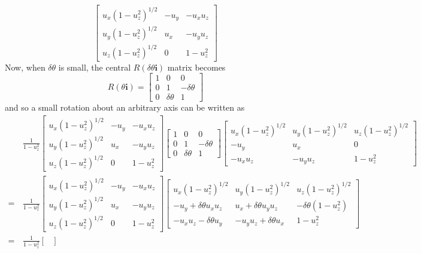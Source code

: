 \documentclass[../principles-of-quantum-mechanics.tex]{subfiles}
\begin{document}
\begin{questions}
\begin{solution}
$$\begin{bmatrix}
			u_x(1 - u_z^2)^{1/2} & -u_y & -u_xu_z \\
			u_y(1 - u_z^2)^{1/2} & u_x & -u_yu_z \\
			u_z(1 - u_z^2)^{1/2} & 0 & 1 - u_z^2
		\end{bmatrix}$$
		Now, when $\delta\theta$ is small, the central $R(\delta\theta\mathbf{i})$ matrix becomes
		$$R(\theta\mathbf{i}) = \begin{bmatrix}
			1 & 0 & 0 \\
			0 & 1 & -\delta\theta \\
			0 & \delta\theta & 1
		\end{bmatrix}$$
		and so a small rotation about an arbitrary axis can be written as
		\begin{align*}
			&\frac{1}{1 - u_z^2}\begin{bmatrix}
				u_x(1 - u_z^2)^{1/2} & -u_y & -u_xu_z \\
				u_y(1 - u_z^2)^{1/2} & u_x & -u_yu_z \\
				u_z(1 - u_z^2)^{1/2} & 0 & 1 - u_z^2
			\end{bmatrix}\begin{bmatrix}
				1 & 0 & 0 \\
				0 & 1 & -\delta\theta \\
				0 & \delta\theta & 1
			\end{bmatrix}\begin{bmatrix}
			u_x(1 - u_z^2)^{1/2} & u_y(1 - u_z^2)^{1/2} & u_z(1 - u_z^2)^{1/2} \\
			-u_y & u_x & 0 \\
			-u_xu_z & -u_yu_z & 1 - u_z^2
		\end{bmatrix} \\
		=\,&\frac{1}{1 - u_z^2}\begin{bmatrix}
			u_x(1 - u_z^2)^{1/2} & -u_y & -u_xu_z \\
			u_y(1 - u_z^2)^{1/2} & u_x & -u_yu_z \\
			u_z(1 - u_z^2)^{1/2} & 0 & 1 - u_z^2
		\end{bmatrix}\begin{bmatrix}
			u_x(1 - u_z^2)^{1/2} & u_y(1 - u_z^2)^{1/2} & u_z(1 - u_z^2)^{1/2} \\
			-u_y + \delta\theta u_xu_z & u_x + \delta\theta u_y u_z & -\delta\theta(1 - u_z^2) \\
			-u_xu_z - \delta\theta u_y & -u_yu_z + \delta\theta u_x & 1 - u_z^2
		\end{bmatrix} \\
		=\,&\frac{1}{1 - u_z^2}\begin{bmatrix}

\end{bmatrix}
\end{align*}
\end{solution}
\end{questions}
\end{document}
